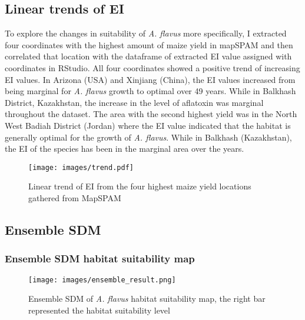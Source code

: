 \subsection{Linear trends of EI}

To explore the changes in suitability of \textit{A. flavus} more specifically, I extracted four coordinates with the highest amount of maize yield in mapSPAM and then correlated that location with the dataframe of extracted EI value assigned with coordinates in RStudio. All four coordinates showed a positive trend of increasing EI values. In Arizona (USA) and Xinjiang (China), the EI values increased from being marginal for \textit{A. flavus} growth to optimal over 49 years. While in Balkhash District, Kazakhstan, the increase in the level of aflatoxin was marginal throughout the dataset. The area with the second highest yield was in the North West Badiah District (Jordan) where the EI value indicated that the habitat is generally optimal for the growth of \textit{A. flavus}. While in Balkhash (Kazakhstan), the EI of the species has been in the marginal area over the years.

\begin{figure*}[!ht]
	\centering
	\texttt{[image: images/trend.pdf]}
	\caption{Linear trend of EI from the four highest maize yield locations gathered from MapSPAM}
	\label{fig:Linear trend of EI from the four highest maize yield locations gathered from MapSPAM}
\end{figure*}

\subsection{Ensemble SDM }
\subsubsection{Ensemble SDM habitat suitability map}

\begin{figure*}[!ht]
	\centering
	\texttt{[image: images/ensemble\_result.png]}
	\caption{Ensemble SDM of \textit{A. flavus} habitat suitability map, the right bar represented the habitat suitability level}
	\label{fig:Ensemble SDM output}
\end{figure*}

